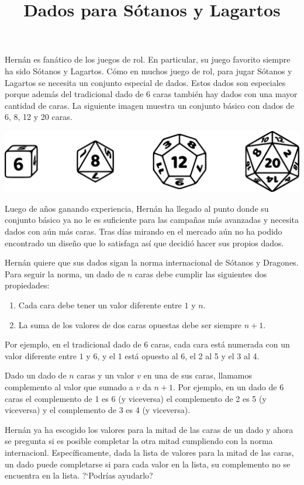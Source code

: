 \documentclass{oci}
\title{Dados para Sótanos y Lagartos}
\begin{document}
\begin{problemDescription}
  Hernán es fanático de los juegos de rol.
  En particular, su juego favorito siempre ha sido Sótanos y Lagartos.
  Cómo en muchos juego de rol, para jugar Sótanos y Lagartos se
  necesita un conjunto especial de dados.
  Estos dados son especiales porque además del tradicional
  dado de 6 caras también hay dados con una mayor cantidad de caras.
  La siguiente imagen muestra un conjunto básico con dados de
  6, 8, 12 y 20 caras.
  \begin{center}
    \includegraphics[scale=0.2]{horizontal-sin4}
  \end{center}

  Luego de años ganando experiencia, Hernán ha llegado al
  punto donde su conjunto básico ya no le es suficiente para
  las campañas más avanzadas y necesita dados con aún más caras.
  Tras días mirando en el mercado aún no ha podido encontrado
  un diseño que lo satisfaga así que decidió hacer sus propios
  dados.

  Hernán quiere que sus dados sigan la norma internacional
  de Sótanos y Dragones.
  Para seguir la norma, un dado de $n$ caras debe cumplir las
  siguientes dos propiedades:
  \begin{enumerate}
    \item Cada cara debe tener un valor diferente entre $1$ y $n$.
    \item La suma de los valores de dos caras opuestas debe ser siempre $n+1$.
  \end{enumerate}
  Por ejemplo, en el tradicional dado de 6 caras, cada cara está numerada
  con un valor diferente entre $1$ y $6$, y el 1 está opuesto al 6,
  el 2 al 5 y el 3 al 4.

  Dado un dado de $n$ caras y un valor $v$ en una de sus caras, llamamos
  complemento al valor que sumado a $v$ da $n+1$.
  Por ejemplo, en un dado de 6 caras el complemento de 1 es 6 (y viceversa)
  el complemento de 2 es 5 (y viceversa) y el complemento de 3 es 4 (y viceversa).

  Hernán ya ha escogido los valores para la mitad
  de las caras de un dado y ahora se pregunta si es posible completar
  la otra mitad cumpliendo con la norma internacionl.
  Específicamente, dada la lista de valores para la mitad de las caras, un
  dado puede completarse si para cada valor en la lista, su complemento no se
  encuentra en la lista.
  ?`Podrías ayudarlo?
\end{problemDescription}
\end{document}
